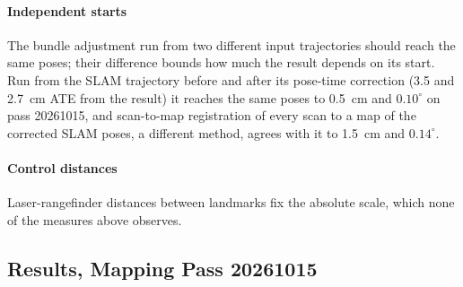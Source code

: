 \paragraph{Independent starts} The bundle adjustment run from two different
input trajectories should reach the same poses; their difference bounds how
much the result depends on its start. Run from the SLAM trajectory before
and after its pose-time correction (3.5 and \SI{2.7}{\centi\metre}
ATE from the result) it reaches the same poses to \SI{0.5}{\centi\metre}
and $0.10^\circ$ on pass 20261015, and scan-to-map registration of every
scan to a map of the corrected SLAM poses, a different method, agrees with
it to \SI{1.5}{\centi\metre} and $0.14^\circ$.

\paragraph{Control distances} Laser-rangefinder distances between landmarks
fix the absolute scale, which none of the measures above observes.

\subsection{Results, Mapping Pass 20261015}


